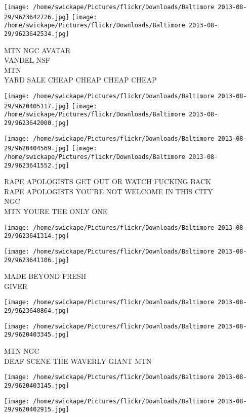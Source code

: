 \documentclass[10pt,letterpaper]{article}
\begin{document}
\texttt{[image: /home/swickape/Pictures/flickr/Downloads/Baltimore 2013-08-29/9623642726.jpg]}
\texttt{[image: /home/swickape/Pictures/flickr/Downloads/Baltimore 2013-08-29/9623642534.jpg]}

MTN NGC AVATAR\\
VANDEL NSF\\
MTN\\
YARD SALE CHEAP CHEAP CHEAP CHEAP
\pagebreak

\texttt{[image: /home/swickape/Pictures/flickr/Downloads/Baltimore 2013-08-29/9620405117.jpg]}
\texttt{[image: /home/swickape/Pictures/flickr/Downloads/Baltimore 2013-08-29/9623642000.jpg]}

\texttt{[image: /home/swickape/Pictures/flickr/Downloads/Baltimore 2013-08-29/9620404569.jpg]}
\texttt{[image: /home/swickape/Pictures/flickr/Downloads/Baltimore 2013-08-29/9623641552.jpg]}

RAPE APOLOGISTS GET OUT OR WATCH FUCKING BACK\\
RAPE APOLOGISTS YOU'RE NOT WELCOME IN THIS CITY\\
NGC\\
MTN YOURE THE ONLY ONE
\pagebreak

\texttt{[image: /home/swickape/Pictures/flickr/Downloads/Baltimore 2013-08-29/9623641314.jpg]}

\vspace{0.25in}
\texttt{[image: /home/swickape/Pictures/flickr/Downloads/Baltimore 2013-08-29/9623641106.jpg]}

MADE BEYOND FRESH\\
GIVER
\pagebreak

\texttt{[image: /home/swickape/Pictures/flickr/Downloads/Baltimore 2013-08-29/9623640864.jpg]}

\vspace{0.25in}
\texttt{[image: /home/swickape/Pictures/flickr/Downloads/Baltimore 2013-08-29/9620403345.jpg]}

MTN NGC\\
DEAF SCENE THE WAVERLY GIANT MTN
\pagebreak

\texttt{[image: /home/swickape/Pictures/flickr/Downloads/Baltimore 2013-08-29/9620403145.jpg]}

\vspace{0.25in}
\texttt{[image: /home/swickape/Pictures/flickr/Downloads/Baltimore 2013-08-29/9620402915.jpg]}
\end{document}
